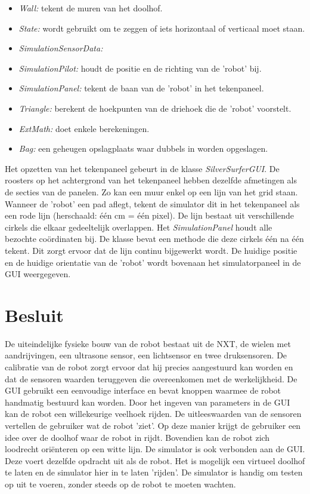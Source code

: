 \documentclass[tt3]{penoverslag}
\begin{document}
\begin{itemize}
\item \textit{Wall:} tekent de muren van het doolhof.
\item \textit{State:} wordt gebruikt om te zeggen of iets horizontaal of verticaal moet staan.
\item \textit{SimulationSensorData: }
\item \textit{SimulationPilot:} houdt de positie en de richting van de 'robot' bij.
\item \textit{SimulationPanel:} tekent de baan van de 'robot' in het tekenpaneel.
\item \textit{Triangle:} berekent de hoekpunten van de driehoek die de 'robot' voorstelt.
\item \textit{ExtMath:} doet enkele berekeningen.
\item \textit{Bag:\cite{Bag.java} } een geheugen opslagplaats waar dubbels in worden opgeslagen.
\end{itemize}

Het opzetten van het tekenpaneel gebeurt in de klasse \textit{SilverSurferGUI}. De roosters op het achtergrond van het tekenpaneel hebben dezelfde afmetingen als de secties van de panelen. Zo kan een muur enkel op een lijn van het grid staan.
Wanneer de 'robot' een pad aflegt, tekent de simulator dit in het tekenpaneel als een rode lijn (herschaald: \'e\'en cm = \'e\'en pixel). De lijn  bestaat uit verschillende cirkels die elkaar gedeeltelijk overlappen. Het \textit{SimulationPanel} houdt alle bezochte co\"ordinaten bij. De klasse bevat een methode die deze cirkels \'e\'en na \'e\'en tekent. Dit zorgt ervoor dat de lijn continu bijgewerkt wordt. De huidige positie en de huidige orientatie van de 'robot' wordt bovenaan het simulatorpaneel in de GUI weergegeven.

\section{Besluit} %
\label{sec:besl}
De uiteindelijke fysieke bouw van de robot bestaat uit de NXT, de wielen met aandrijvingen, een ultrasone sensor, een lichtsensor en twee druksensoren.
De calibratie van de robot zorgt ervoor dat hij precies aangestuurd kan worden en dat de sensoren waarden teruggeven die overeenkomen met de werkelijkheid.
De GUI gebruikt een eenvoudige interface en bevat knoppen waarmee de robot handmatig bestuurd kan worden. Door het ingeven van parameters in de GUI kan de robot een willekeurige veelhoek rijden. De uitleeswaarden van de sensoren vertellen de gebruiker wat de robot 'ziet'. Op deze manier krijgt de gebruiker een idee over de doolhof waar de robot in rijdt. Bovendien kan de robot zich loodrecht ori\"enteren op een witte lijn. De simulator is ook verbonden aan de GUI. Deze voert dezelfde opdracht uit als de robot. Het is mogelijk een virtueel doolhof te laten en de simulator hier in te laten 'rijden'. De simulator is handig om testen op uit te voeren, zonder steeds op de robot te moeten wachten.
\end{document}
